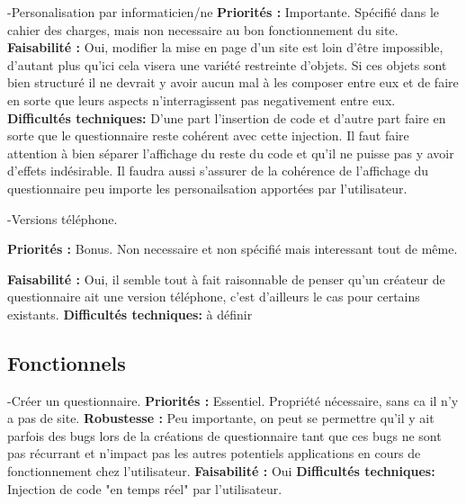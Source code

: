 \documentclass{article}
\begin{document}
-Personalisation par informaticien/ne\newline
\textbf{Priorités : }Importante. Spécifié dans le cahier des charges, mais non necessaire au bon fonctionnement du site. \newline
\textbf{Faisabilité : }Oui, modifier la mise en page d'un site est loin d'être impossible, d'autant plus qu'ici cela visera une variété restreinte d'objets. Si ces objets sont bien structuré il ne devrait y avoir aucun mal à les composer entre eux et de faire en sorte que leurs aspects n'interragissent pas negativement entre eux.\newline
\textbf{Difficultés techniques: } D'une part l'insertion de code et d'autre part faire en sorte que le questionnaire reste cohérent avec cette injection. Il faut faire attention à bien séparer l'affichage du reste du code et qu'il ne puisse pas y avoir d'effets indésirable. Il faudra aussi s'assurer de la cohérence de l'affichage du questionnaire peu importe les personailsation apportées par l'utilisateur. \newline

-Versions téléphone.\newline

\textbf{Priorités : }Bonus. Non necessaire et non spécifié mais interessant tout de même.\newline

\textbf{Faisabilité : } Oui, il semble tout à fait raisonnable de penser qu'un créateur de questionnaire ait une version téléphone, c'est d'ailleurs le cas pour certains existants.\newline
\textbf{Difficultés techniques: } à définir\newline

\subsection{Fonctionnels}

-Créer un questionnaire.\newline
\textbf{Priorités : }Essentiel. Propriété nécessaire, sans ca il n'y a pas de site. \newline
\textbf{Robustesse : }Peu importante, on peut se permettre qu'il y ait parfois des bugs lors de la créations de questionnaire tant que ces bugs ne sont pas récurrant et n'impact pas les autres potentiels applications en cours de fonctionnement chez l'utilisateur.\newline
\textbf{Faisabilité : }Oui\newline
\textbf{Difficultés techniques: }Injection de code "en temps réel" par l'utilisateur.\newline
\end{document}
